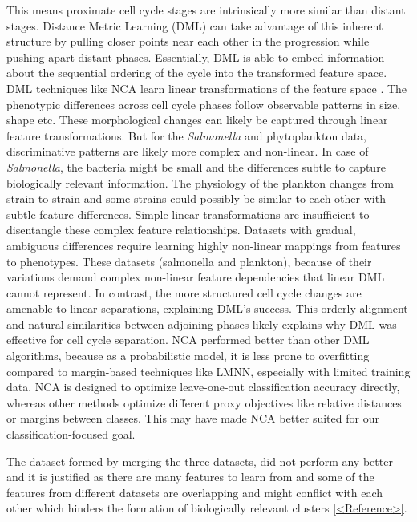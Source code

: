 \documentclass[12pt,a4paper]{article}
\begin{document}
This means proximate cell cycle stages are intrinsically more similar than distant stages. Distance Metric Learning (DML) can take advantage of this inherent structure by pulling closer points near each other in the progression while pushing apart distant phases. Essentially, DML is able to embed information about the sequential ordering of the cycle into the transformed feature space. DML techniques like NCA learn linear transformations of the feature space \cite{NCA}. The phenotypic differences across cell cycle phases follow observable patterns in size, shape etc. These morphological changes can likely be captured through linear feature transformations. But for the \textit{Salmonella} and phytoplankton data, discriminative patterns are likely more complex and non-linear. In case of \textit{Salmonella}, the bacteria might be small and the differences subtle to capture biologically relevant information. The physiology of the plankton changes from strain to strain and some strains could possibly be similar to each other with subtle feature differences. Simple linear transformations are insufficient to disentangle these complex feature relationships. Datasets with gradual, ambiguous differences require learning highly non-linear mappings from features to phenotypes. These datasets (salmonella and plankton), because of their variations demand complex non-linear feature dependencies that linear DML cannot represent. In contrast, the more structured cell cycle changes are amenable to linear separations, explaining DML's success. This orderly alignment and natural similarities between adjoining phases likely explains why DML was effective for cell cycle separation. NCA performed better than other DML algorithms, because as a probabilistic model, it is less prone to overfitting compared to margin-based techniques like LMNN, especially with limited training data. NCA is designed to optimize leave-one-out classification accuracy directly, whereas other methods optimize different proxy objectives like relative distances or margins between classes. This may have made NCA better suited for our classification-focused goal.

The dataset formed by merging the three datasets, did not perform any better and it is justified as there are many features to learn from and some of the features from different datasets are overlapping and might conflict with each other which hinders the formation of biologically relevant clusters \ref{<Reference>}.
\end{document}
